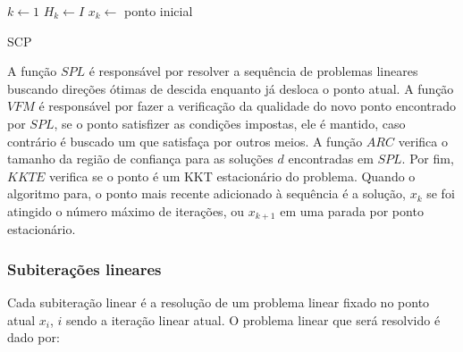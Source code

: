\begin{algorithm}[H]
  \SetAlgoLined
  \( k \gets 1 \)\;
  \( H_k \gets I \)\;
  \( x_k \gets \) ponto inicial\;
  
  \caption{SCP}
\end{algorithm}
\vspace{15pt}


A função \(SPL\) é responsável por resolver a sequência de problemas lineares
buscando direções ótimas de descida enquanto já desloca o ponto atual. A função
\(VFM\) é responsável por fazer a verificação da qualidade do novo ponto encontrado
por \(SPL\), se o ponto satisfizer as condições impostas, ele é mantido, caso contrário
é buscado um que satisfaça por outros meios. A função \(ARC\) verifica o tamanho da região
de confiança para as soluções \(d\) encontradas em \(SPL\). Por fim, \(KKTE\) verifica
se o ponto é um KKT estacionário do problema. Quando o algoritmo para, o ponto
mais recente adicionado à sequência é a solução, \(x_k\) se foi atingido
o número máximo de iterações, ou \(x_{k+1}\) em uma parada por ponto
estacionário.

\subsubsection{Subiterações lineares}

\noindent
Cada subiteração linear é a resolução de um problema linear fixado no ponto
atual \( x_i \), \(i\) sendo a iteração linear atual. O problema linear que
será resolvido é dado por:



